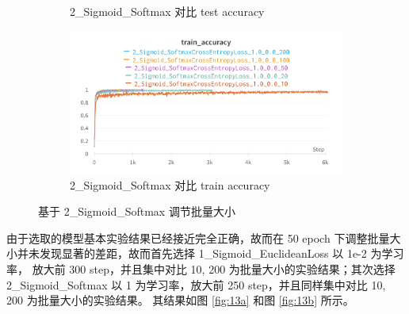 \documentclass{article}
\begin{document}
\begin{figure}[htbp]
\begin{subfigure}{0.475\textwidth}
		\caption{2\_Sigmoid\_Softmax 对比 test accuracy}
	\end{subfigure}
	\begin{subfigure}{0.475\textwidth}
		\centering
		\includegraphics[width=1\textwidth]{../pics/批量大小_2_Sigmoid_Softmax_train_acc.png}
		\caption{2\_Sigmoid\_Softmax 对比 train accuracy}
	\end{subfigure}
	\caption{基于 2\_Sigmoid\_Softmax 调节批量大小}
	\label{fig:12}
\end{figure}

由于选取的模型基本实验结果已经接近完全正确，故而在 50 epoch 下调整批量大小并未发现显著的差距，故而首先选择 1\_Sigmoid\_EuclideanLoss 以 1e-2 为学习率，
放大前 300 step，并且集中对比 10, 200 为批量大小的实验结果；其次选择 2\_Sigmoid\_Softmax 以 1 为学习率，放大前 250 step，并且同样集中对比 10, 200 为批量大小的实验结果。
其结果如图 \ref{fig:13a} 和图 \ref{fig:13b} 所示。
\end{document}
